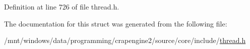 Definition at line 726 of file thread.\+h.



The documentation for this struct was generated from the following file\+:\begin{DoxyCompactItemize}
\item 
/mnt/windows/data/programming/crapengine2/source/core/include/\hyperlink{thread_8h}{thread.\+h}\end{DoxyCompactItemize}
